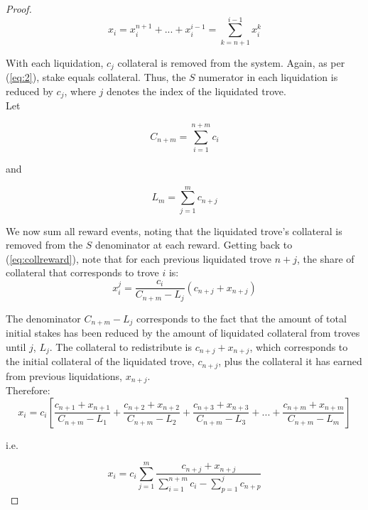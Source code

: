 \documentclass[reqno]{article}
\begin{document}
\begin{proof}
\begin{equation}
  x_i = x_i^{n+1} + ... + x_i^{i-1} = \sum_{k=n+1}^{i-1}x_i^k
\end{equation}

With each liquidation, $c_j$ collateral is removed from the system. Again, as per (\ref{eq:2}), stake equals collateral. Thus, the $S$ numerator in each liquidation is reduced by $c_j$, where $j$ denotes the index of the liquidated trove.\\ 


Let

\begin{equation} 
    C_{n+m}=\sum\limits^{n+m}_{i=1}c_i
\end{equation}

\bigskip
and

\begin{equation} 
    L_m=\sum\limits^m_{j=1}c_{n+j}
\end{equation}

\bigskip
We now sum all reward events, noting that the liquidated trove’s collateral is removed from the $S$ denominator at each reward. Getting back to (\ref{eq:collreward}), note that for each previous liquidated trove $n+j$, the share of collateral that corresponds to trove $i$ is: \\

\begin{equation} 
  x_i^j = \frac{c_i}{C_{n+m}-L_j}(c_{n+j}+x_{n+j})
\end{equation}

The denominator $C_{n+m}-L_j$ corresponds to the fact that the amount of total initial stakes has been reduced by the amount of liquidated collateral from  troves until $j$, $L_j$. The collateral to redistribute is $c_{n+j}+x_{n+j}$, which corresponds to the initial collateral of the liquidated trove, $c_{n+j}$, plus the collateral it has earned from previous liquidations, $x_{n+j}$. \\

Therefore:\\

\begin{equation} 
    x_i=c_i\left[\frac{c_{n+1}+x_{n+1}}{C_{n+m}-L_1}+\frac{c_{n+2}+x_{n+2}}{C_{n+m}-L_2}+\frac{c_{n+3}+x_{n+3}}{C_{n+m}-L_3}+...+\frac{c_{n+m}+x_{n+m}}{C_{n+m}-L_m}\right]
\end{equation}

\bigskip
i.e.

\begin{equation} 
    x_i=c_i\sum\limits^m_{j=1}\frac{c_{n+j}+x_{n+j}}{\sum\limits^{n+m}_{i=1}c_i-\sum\limits^j_{p=1}c_{n+p}}
\end{equation}


\end{proof}
\end{document}
